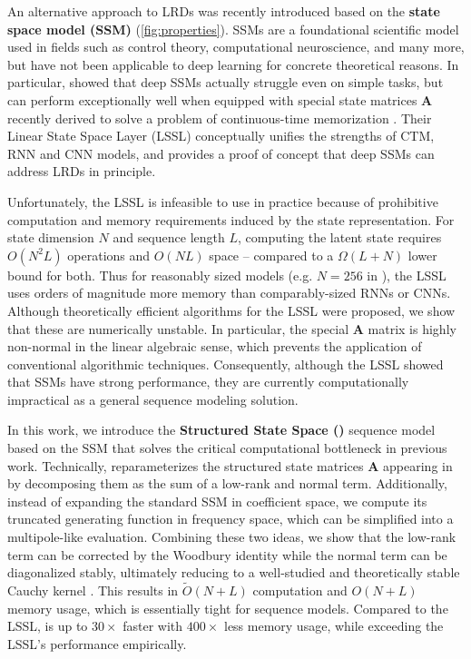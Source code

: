 An alternative approach to LRDs was recently introduced based on the \textbf{state space model (SSM)} (\cref{fig:properties}).
SSMs are a foundational scientific model used in fields such as control theory, computational neuroscience, and many more, but have not been applicable to deep learning for concrete theoretical reasons.
In particular, \citet{gu2021lssl} showed that deep SSMs actually struggle even on simple tasks,
but can perform exceptionally well when equipped with special state matrices \( \bm{A} \) recently derived to solve a problem of continuous-time memorization \citep{voelker2019legendre,gu2020hippo}.
Their Linear State Space Layer (LSSL) conceptually unifies the strengths of CTM, RNN and CNN models, and provides a proof of concept that deep SSMs can address LRDs in principle.

Unfortunately, the LSSL is infeasible to use in practice because of prohibitive computation and memory requirements induced by the state representation.
For state dimension \( N \) and sequence length \( L \), computing the latent state requires \( O(N^2L) \) operations and \( O(NL) \) space -- compared to a \( \Omega(L+N) \) lower bound for both.
Thus for reasonably sized models (e.g. \( N=256 \) in \citet{gu2021lssl}), the LSSL uses orders of magnitude more memory than comparably-sized RNNs or CNNs.
Although theoretically efficient algorithms for the LSSL were proposed, we show that these are numerically unstable.
In particular, the special \( \bm{A} \) matrix is highly non-normal in the linear algebraic sense, which prevents the application of conventional algorithmic techniques. %
Consequently, although the LSSL showed that SSMs have strong performance, they are currently computationally impractical as a general sequence modeling solution.

In this work, we introduce the \textbf{Structured State Space (\methodabbrv)} sequence model based on the SSM that solves the critical computational bottleneck in previous work.
Technically, \methodabbrv{} reparameterizes the structured state matrices \( \bm{A} \) appearing in \citet{voelker2019legendre,gu2020hippo} by decomposing them as the sum of a low-rank and normal term.
Additionally, instead of expanding the standard SSM in coefficient space, we compute its truncated generating function in frequency space, which can be simplified into a multipole-like evaluation.
Combining these two ideas, we show that the low-rank term can be corrected by the Woodbury identity while the normal term can be diagonalized stably,
ultimately reducing to a well-studied and theoretically stable Cauchy kernel \citep{pan2001structured,pan2017fast}.
This results in \( \tilde{O}(N+L) \) computation and \( O(N+L) \) memory usage, which is essentially tight for sequence models.
Compared to the LSSL, \methodabbrv{} is up to $30\times$ faster with $400\times$ less memory usage, while exceeding the LSSL's performance empirically.






